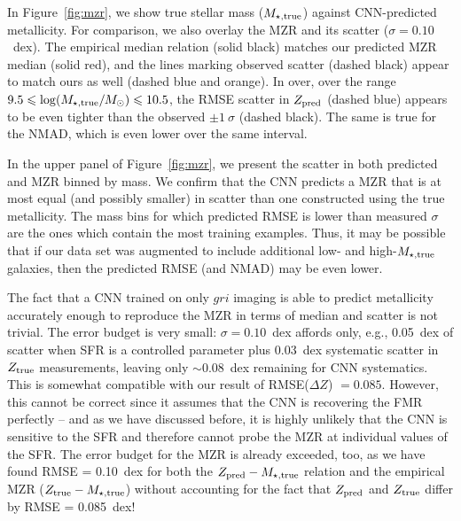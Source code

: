 \documentclass[fleqn,usenatbib]{mnras}
\begin{document}
In Figure~\ref{fig:mzr}, we show true stellar mass ($M_{\star, \rm true}$) against CNN-predicted metallicity.
For comparison, we also overlay the \cite{Tremonti2004} MZR and its scatter ($\sigma = 0.10$~dex).
The empirical median relation (solid black) matches our predicted MZR median (solid red), and the lines marking observed scatter (dashed black) appear to match ours as well (dashed blue and orange).
In over, over the range $9.5 \leq \log (M_{\star, \rm true}/M_\odot) \leq 10.5$, the RMSE scatter in $Z_{\rm pred}$ (dashed blue) appears to be even tighter than the observed $\pm 1~\sigma$ (dashed black).
The same is true for the NMAD, which is even lower over the same interval.

In the upper panel of Figure~\ref{fig:mzr}, we present the scatter in both predicted and \cite{Tremonti2004} MZR binned by mass.
We confirm that the CNN predicts a MZR that is at most equal (and possibly smaller) in scatter than one constructed using the true metallicity.
The mass bins for which predicted RMSE is lower than measured $\sigma$ are the ones which contain the most training examples.
Thus, it may be possible that if our data set was augmented to include additional low- and high-$M_{\rm \star,true}$ galaxies, then the predicted RMSE (and NMAD) may be even lower.

The fact that a CNN trained on only $gri$ imaging is able to predict metallicity accurately enough to reproduce the MZR in terms of median and scatter is not trivial.
The error budget is very small: $\sigma = 0.10$~dex affords only, e.g., 0.05~dex of scatter when SFR is a controlled parameter plus 0.03~dex systematic scatter in $Z_{\rm true}$ measurements, leaving only $\sim 0.08$~dex remaining for CNN systematics.
This is somewhat compatible with our result of RMSE($\Delta Z$) $= 0.085$.
However, this cannot be correct since it assumes that the CNN is recovering the FMR perfectly -- and as we have discussed before, it is highly unlikely that the CNN is sensitive to the SFR and therefore cannot probe the MZR at individual values of the SFR.
The error budget for the MZR is already exceeded, too, as we have found RMSE = 0.10~dex for both the $Z_{\rm pred}-M_{\star,\rm true}$ relation and the empirical MZR ($Z_{\rm true}-M_{\star,\rm true}$) without accounting for the fact that $Z_{\rm pred}$ and $Z_{\rm true}$ differ by RMSE = 0.085~dex!
\end{document}
